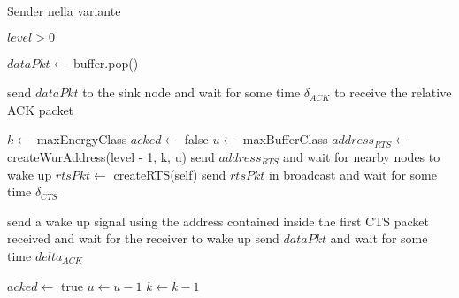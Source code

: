 \documentclass[binding=0.6cm,TFA]{sapthesis}
\begin{document}
\begin{algorithm}
    \caption{Sender nella variante}
    \begin{algorithmic}
        \REQUIRE $level > 0$

            \STATE $dataPkt \leftarrow$ buffer.pop()

                \STATE send $dataPkt$ to the sink node and wait for some time $\delta_{ACK}$ to receive the relative ACK packet

            \ELSE
                \STATE $k \leftarrow$ maxEnergyClass
                \STATE $acked \leftarrow$ false
                    \STATE $u \leftarrow$ maxBufferClass
                        \STATE $address_{RTS} \leftarrow$ createWurAddress(level - 1, k, u)
                        \STATE send $address_{RTS}$ and wait for nearby nodes to wake up
                        \STATE $rtsPkt \leftarrow$ createRTS(self)
                        \STATE send $rtsPkt$ in broadcast and wait for some time $\delta_{CTS}$
                        
                            \STATE send a wake up signal using the address contained inside the first CTS packet received and wait for the receiver to wake up
                            \STATE send $dataPkt$ and wait for some time $delta_{ACK}$

                                \STATE $acked \leftarrow$ true
                            \ENDIF
                        \ENDIF
                        \STATE $u \leftarrow u-1$
                    \ENDWHILE
                    \STATE $k \leftarrow k-1$
                \ENDWHILE
            \ENDIF
        
        \ENDWHILE
    \end{algorithmic}
\end{algorithm}
\end{document}
